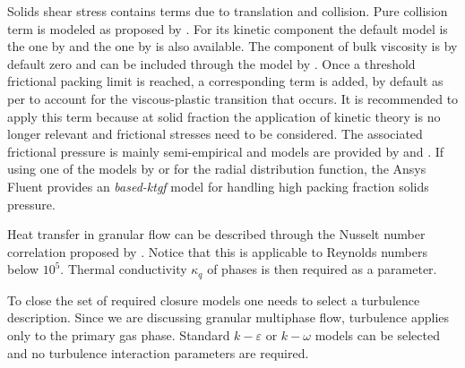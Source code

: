 Solids shear stress contains terms due to translation and collision. Pure collision term is modeled as proposed by \textcite{Gidaspow1992}. For its kinetic component the default model is the one by \textcite{Syamlal1993} and the one by \textcite{Gidaspow1992} is also available. The component of bulk viscosity  is by default zero and can be included through the model by \textcite{Lun1984}. Once a threshold frictional packing limit is reached, a corresponding term is added, by default as per \textcite{Schaeffer1987} to account for the viscous-plastic transition that occurs. It is recommended to apply this term because at solid fraction the application of kinetic theory is no longer relevant and frictional stresses need to be considered. The associated frictional pressure is mainly semi-empirical and models are provided by \textcite{Johnson1987} and \textcite{Syamlal1993}. If using one of the models by \textcite{Lun1984} or \textcite{Gidaspow1992} for the radial distribution function, the Ansys Fluent provides an \emph{based-ktgf} model for handling high packing fraction solids pressure.
 
Heat transfer in granular flow can be described through the Nusselt number correlation proposed by \textcite{Gunn1978}. Notice that this is applicable to Reynolds numbers below $10^5$. Thermal conductivity $\kappa_q$ of phases is then required as a parameter.

To close the set of required closure models one needs to select a turbulence description. Since we are discussing granular multiphase flow, turbulence applies only to the primary gas phase. Standard $k-\varepsilon$ or $k-\omega$ models can be selected and no turbulence interaction parameters are required.

\endinput
